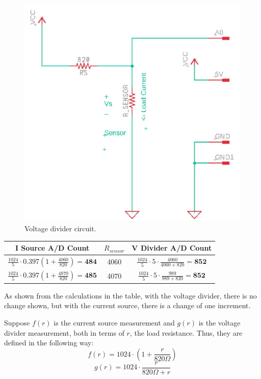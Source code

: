 \documentclass[12pt]{article}
\begin{document}
\begin{figure}[]
    \centering
    \includegraphics[width=0.5\linewidth]{vd.png}
    \caption{Voltage divider circuit.}
    \label{fig:vdiv}
\end{figure}

\begin{table}[ht]
    \centering
    \begin{tabular}{| c | c | c |}
        \hline 
        \textbf{I Source A/D Count} & $R_{sensor}$ & \textbf{V Divider A/D Count} \\
        \hline
        $\frac{1024}{5} \cdot 0.397 \left(1 + \frac{4060}{820}\right) = \mathbf{484}$ & 
        4060 & 
        $\frac{1024}{5}\cdot 5\cdot \frac{4060}{4060 + 820} = \mathbf{852}$ \\
        \hline

        $\frac{1024}{5} \cdot 0.397 \left(1 + \frac{4870}{820}\right) = \mathbf{485}$ & 
        4070 & 
        $\frac{1024}{5}\cdot 5\cdot \frac{989}{989 + 820} = \mathbf{852}$ \\
        
        \hline 
    \end{tabular}
\end{table}

As shown from the calculations in the table, with the voltage divider, there is no change shown, but with the current source, there is a change of one increment. 

Suppose $f(r)$ is the current source measurement and $g(r)$ is the voltage divider measurement, both in terms of $r$, the load resistance. Thus, they are defined in the following way:
\begin{equation}
    f(r) = 1024 \cdot \left(1 + \frac{r}{820\Omega}\right)
\end{equation}
\begin{equation}
    g(r) = 1024 \cdot \frac{r}{820\Omega + r}
\end{equation}
\end{document}
